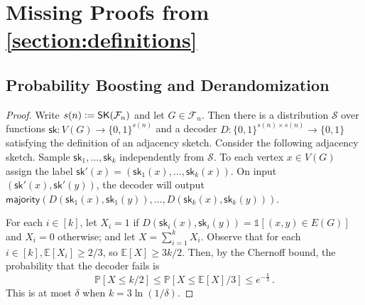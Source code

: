 \documentclass{article}
\newcommand{\Ex}[1]{\bE \left[ #1 \right]}
\renewcommand{\Pr}[1]{\bP \left[ #1 \right]} %
\newcommand{\define}{\vcentcolon=}
\newcommand{\ind}[1]{\mathds{1} \left[ #1 \right] }
\newcommand{\zo}{\{0,1\}}
\newcommand{\cF}{\ensuremath{\mathcal{F}}}
\newcommand{\cS}{\ensuremath{\mathcal{S}}}
\newcommand{\bE}{\ensuremath{\mathbb{E}}}
\newcommand{\bP}{\ensuremath{\mathbb{P}}}
\newcommand{\sk}{\mathsf{sk}}
\newcommand{\RL}{\mathsf{SK}}
\begin{document}
% 
% 








\appendix

\section{Missing Proofs from \texorpdfstring{\cref{section:definitions}}{Section 3}}
\label{section:missing-proofs}

\subsection{Probability Boosting and Derandomization}
\propboosting*
\begin{proof}
Write $s(n) \define \RL(\cF_n)$ and let $G \in \cF_n$. Then there is a distribution $\cS$ over
functions $\sk : V(G) \to \zo^{s(n)}$ and a decoder $D : \zo^{s(n) \times s(n)} \to \zo$ satisfying
the definition of an adjacency sketch. Consider the following adjacency sketch.  Sample $\sk_1,
\dotsc, \sk_k$ independently from $\cS$. To each vertex $x \in V(G)$ assign the label $\sk'(x) =
(\sk_1(x), \dotsc, \sk_k(x))$. On input $(\sk'(x),\sk'(y))$, the decoder will output
$\mathsf{majority}(D(\sk_1(x), \sk_1(y)), \dotsc, D(\sk_k(x),\sk_k(y)))$.

For each $i \in [k]$, let $X_i = 1$ if $D(\sk_i(x),\sk_i(y)) = \ind{(x,y) \in E(G)}$ and $X_i = 0$
otherwise; and let $X = \sum_{i=1}^k X_i$.  Observe that for each $i \in [k], \Ex{X_i} \geq 2/3$,
so $\Ex{X} \geq 3k/2$. Then, by the Chernoff bound, the probability that the decoder fails is
\[
  \Pr{ X \leq k/2 }
  \leq \Pr{ X \leq \Ex{X}/3 }
  \leq e^{-\frac{k}{3}} \,.
\]
This is at most $\delta$ when $k = 3\ln(1/\delta)$.
\end{proof}
\end{document}
